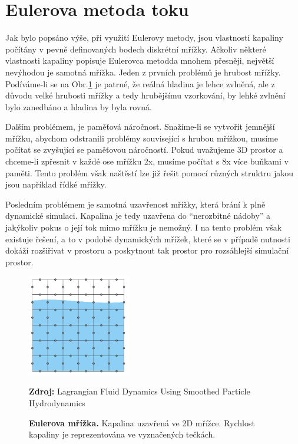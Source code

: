 \section{Eulerova metoda toku}
Jak bylo popsáno výše, při využití Eulerovy metody, jsou vlastnosti kapaliny počítány v pevně definovaných bodech diskrétní mřížky. Ačkoliv některé vlastnosti kapaliny popisuje Eulerovca metodda mnohem přesněji, největší nevýhodou je samotná mřížka. Jeden z prvních problémů je hrubost mřížky. Podíváme-li se na Obr.\ref{fig:EulerGrid} je patrné, že reálná hladina je lehce zvlněná, ale z důvodu velké hrubosti mřížky a tedy hrubějšímu vzorkování, by lehké zvlnění bylo zanedbáno a hladina by byla rovná. 

Dalším problémem, je paměťová náročnost. Snažíme-li se vytvořit jemnější mřížku, abychom odstranili problémy související s hrubou mřížkou, musíme počítat se zvyšující se paměťovou náročností. Pokud uvažujeme 3D prostor a chceme-li zpřesnit v každé ose mřížku 2x, musíme počítat s 8x více buňkami v paměti. Tento problém však naštěstí lze již řešit pomocí různých struktru jakou jsou například řídké mřížky.

Posledním problémem je samotná uzavřenost mřížky, která brání k plně dynamické simulaci. Kapalina je tedy uzavřena do \enquote{nerozbitné nádoby} a jakýkoliv pokus o její tok mimo mřížku je nemožný. I na tento problém však existuje řešení, a to v podobě dynamických mřížek, které se v případě nutnosti dokáží rozšiřivat v prostoru a poskytnout tak prostor pro rozsáhlejší simulační prostor.
\cite{KelagerSPH} 

\begin{figure}[hbt]
	\centering
	\includegraphics[width=0.4\textwidth]{obrazky-figures/GridEuler.PNG}
	\caption{\textbf{Eulerova mřížka.} Kapalina uzavřená ve 2D mřížce. Rychlost kapaliny je reprezentována ve vyznačených tečkách.}
	\textbf{Zdroj: } Lagrangian Fluid Dynamics Using Smoothed Particle Hydrodynamics \cite{KelagerSPH}
	\label{fig:EulerGrid}
\end{figure}

